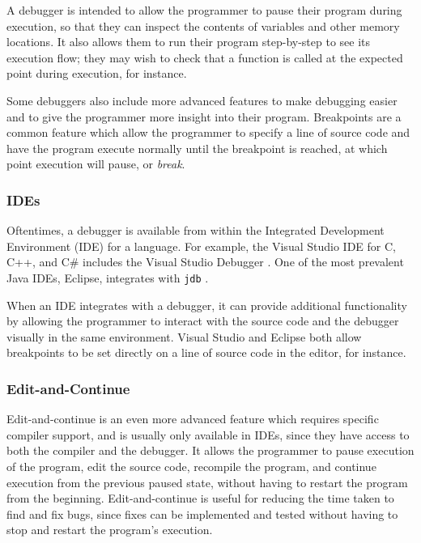 \documentclass[authoryearcitations]{UoYCSproject}
\begin{document}
A debugger is intended to allow the programmer to pause their program during
execution, so that they can inspect the contents of variables and other memory
locations. It also allows them to run their program step-by-step to see its
execution flow; they may wish to check that a function is called at the expected
point during execution, for instance.

Some debuggers also include more advanced features to make debugging easier and to
give the programmer more insight into their program. Breakpoints are a common feature
which allow the programmer to specify a line of source code and have the program
execute normally until the breakpoint is reached, at which point execution will
pause, or \emph{break}.

\subsubsection{IDEs}
\label{sec:IDEs}

Oftentimes, a debugger is available from within the Integrated Development
Environment (IDE) for a language. For example, the Visual Studio IDE for C, C++,
and C\# includes the Visual Studio Debugger \citep{msdnsite}. One of the most
prevalent Java IDEs, Eclipse, integrates with \texttt{jdb} \citep{eclipsesite}.

When an IDE integrates with a debugger, it can provide additional functionality
by allowing the programmer to interact with the source code and the debugger
visually in the same environment. Visual Studio and Eclipse both allow breakpoints
to be set directly on a line of source code in the editor, for instance.

\subsubsection{Edit-and-Continue}
\label{sec:EditAndContinue}

Edit-and-continue is an even more advanced feature which requires specific
compiler support, and is usually only available in IDEs, since they have access
to both the compiler and the debugger. It allows the programmer to pause execution
of the program, edit the source code, recompile the program, and continue execution
from the previous paused state, without having to restart the program from the
beginning. Edit-and-continue is useful for reducing the time taken to find and
fix bugs, since fixes can be implemented and tested without having to stop and
restart the program's execution.
\end{document}

